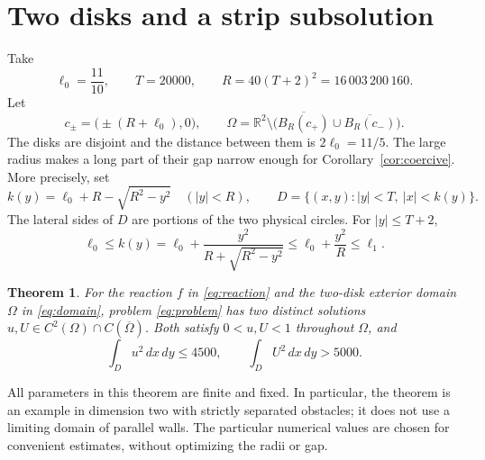 \documentclass[11pt]{article}
\newcommand{\R}{\mathbb R}
\newtheorem{theorem}{Theorem}[section]
\begin{document}
\section{Two disks and a strip subsolution}\label{sec:geometry}

Take
\begin{equation}\label{eq:constants}
 \ell_0=\frac{11}{10},\qquad T=20000,\qquad
 R=40(T+2)^2=16\,003\,200\,160.
\end{equation}
Let
\begin{equation}\label{eq:domain}
 c_\pm=\bigl(\pm(R+\ell_0),0\bigr),\qquad
 \Omega=\R^2\setminus
 \bigl(\overline{B_R(c_+)}\cup\overline{B_R(c_-)}\bigr).
\end{equation}
The disks are disjoint and the distance between them is \(2\ell_0=11/5\).
The large radius makes a long part of their gap narrow enough for
Corollary~\ref{cor:coercive}. More precisely, set
\[
 k(y)=\ell_0+R-\sqrt{R^2-y^2}\quad(|y|<R),\qquad
 D=\{(x,y):|y|<T,\ |x|<k(y)\}.
\]
The lateral sides of \(D\) are portions of the two physical circles.
For \(|y|\le T+2\),
\begin{equation}\label{eq:width}
 \ell_0\le k(y)
 =\ell_0+\frac{y^2}{R+\sqrt{R^2-y^2}}
 \le\ell_0+\frac{y^2}{R}\le\ell_1.
\end{equation}

\begin{theorem}\label{thm:main}
For the reaction \(f\) in \eqref{eq:reaction} and the two-disk exterior
domain \(\Omega\) in \eqref{eq:domain}, problem \eqref{eq:problem} has
two distinct solutions \(u,U\in C^2(\Omega)\cap C(\overline\Omega)\).
Both satisfy \(0<u,U<1\) throughout \(\Omega\), and
\begin{equation}\label{eq:separation}
 \int_Du^2\,dx\,dy\le4500,\qquad
 \int_DU^2\,dx\,dy>5000.
\end{equation}
\end{theorem}

All parameters in this theorem are finite and fixed. In particular,
the theorem is an example in dimension two with strictly separated
obstacles; it does not use a limiting domain of parallel walls.
The particular numerical values are chosen for convenient estimates,
without optimizing the radii or gap.
\end{document}
